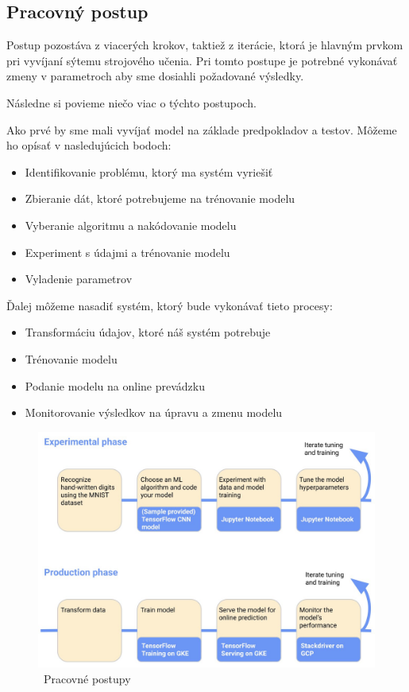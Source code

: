 \subsection{Pracovný postup}
Postup pozostáva z viacerých krokov, taktiež z iterácie, ktorá je hlavným prvkom pri vyvíjaní sýtemu strojového učenia. Pri tomto postupe je potrebné vykonávať zmeny v parametroch aby sme dosiahli požadované výsledky.

Následne si povieme niečo viac o týchto postupoch.

Ako prvé by sme mali vyvíjať model na základe predpokladov a testov. Môžeme ho opísať v nasledujúcich bodoch:\cite{web}

\begin{itemize}
    \item Identifikovanie problému, ktorý ma systém vyriešiť 
    \item Zbieranie dát, ktoré potrebujeme na trénovanie modelu
    \item Vyberanie algoritmu a nakódovanie modelu
    \item Experiment s údajmi a trénovanie modelu
	\item Vyladenie parametrov
\end{itemize}

Ďalej môžeme nasadiť systém, ktorý bude vykonávať tieto procesy:

\begin{itemize}
    \item Transformáciu údajov, ktoré náš systém potrebuje
	\item Trénovanie modelu
	\item Podanie modelu na online prevádzku
	\item Monitorovanie výsledkov na úpravu a zmenu modelu
\end{itemize}

\begin{figure}[!ht]
    \includegraphics[width=.9\textwidth]{figures/kubeflowwork}
    \caption{\ Pracovné postupy \label{o:latex_friendly_zone}}
\end{figure}

